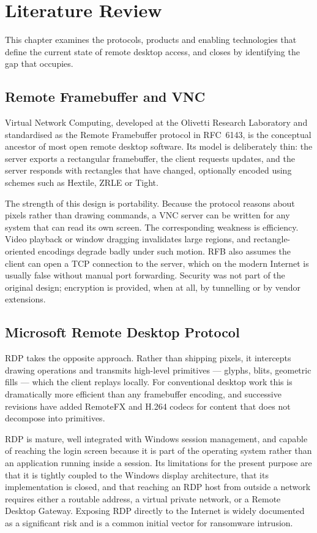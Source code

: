 \chapter{Literature Review}

This chapter examines the protocols, products and enabling technologies that
define the current state of remote desktop access, and closes by identifying the
gap that \updesk{} occupies.

\section{Remote Framebuffer and VNC}

Virtual Network Computing, developed at the Olivetti Research Laboratory and
standardised as the Remote Framebuffer protocol in RFC~6143, is the conceptual
ancestor of most open remote desktop software. Its model is deliberately thin:
the server exports a rectangular framebuffer, the client requests updates, and
the server responds with rectangles that have changed, optionally encoded using
schemes such as Hextile, ZRLE or Tight.

The strength of this design is portability. Because the protocol reasons about
pixels rather than drawing commands, a VNC server can be written for any system
that can read its own screen. The corresponding weakness is efficiency. Video
playback or window dragging invalidates large regions, and rectangle-oriented
encodings degrade badly under such motion. RFB also assumes the client can open
a TCP connection to the server, which on the modern Internet is usually false
without manual port forwarding. Security was not part of the original design;
encryption is provided, when at all, by tunnelling or by vendor extensions.

\section{Microsoft Remote Desktop Protocol}

RDP takes the opposite approach. Rather than shipping pixels, it intercepts
drawing operations and transmits high-level primitives --- glyphs, blits,
geometric fills --- which the client replays locally. For conventional desktop
work this is dramatically more efficient than any framebuffer encoding, and
successive revisions have added RemoteFX and H.264 codecs for content that does
not decompose into primitives.

RDP is mature, well integrated with Windows session management, and capable of
reaching the login screen because it is part of the operating system rather than
an application running inside a session. Its limitations for the present purpose
are that it is tightly coupled to the Windows display architecture, that its
implementation is closed, and that reaching an RDP host from outside a network
requires either a routable address, a virtual private network, or a Remote
Desktop Gateway. Exposing RDP directly to the Internet is widely documented as a
significant risk and is a common initial vector for ransomware intrusion.

